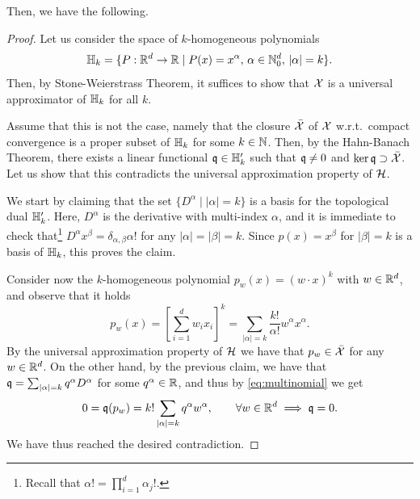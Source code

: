 Then, we have the following.

\begin{proof}
    Let us consider the space of $k$-homogeneous polynomials 
    \begin{equation}
    \mathbb{H}_k = \{ P:\mathbb{R}^d\to \mathbb{R}\mid P(x) = x^\alpha,\, \alpha\in \mathbb{N}^d_0,\, |\alpha|=k\}.
    \end{equation}
    Then, by Stone-Weierstrass Theorem, it suffices to show that $\mathcal{X}$ is a universal approximator of $\mathbb{H}_k$ for all $k$.

    Assume that this is not the case, namely that the closure $\bar{\mathcal{X}}$ of $\mathcal{X}$ w.r.t.~compact convergence is a proper subset of $\mathbb{H}_k$ for some $k\in \mathbb{N}$. 
    Then, by the Hahn-Banach Theorem, there exists a linear functional $\mathfrak{q}\in \mathbb{H}_k'$ such that $\mathfrak{q}\neq 0$ and $\ker\mathfrak{q}\supset\bar{\mathcal{X}}$.
    Let us show that this contradicts the universal approximation property of $\mathcal{H}$.

    We start by claiming that the set $\{D^\alpha \mid |\alpha|=k\}$ is a basis for the topological dual $\mathbb{H}_k'$. Here, $D^\alpha$ is the derivative with multi-index $\alpha$, and it is immediate to check that\footnote{Recall that $\alpha!=\prod_{i=1}^d \alpha_j!$.} $D^\alpha x^\beta = \delta_{\alpha,\beta}\alpha!$ for any $|\alpha|=|\beta|=k$. Since $p(x)=x^\beta$ for $|\beta|=k$ is a basis of $\mathbb{H}_k$, this proves the claim.

    Consider now the $k$-homogeneous polynomial $p_w(x)=(w\cdot x)^k$ with $w\in \mathbb{R}^d$, and observe that it holds
    \begin{equation}
        \label{eq:multinomial}
        p_w(x) = \left[ \sum_{i=1}^d w_ix_i \right]^k = \sum_{|\alpha|=k}\frac{k!}{\alpha!}w^\alpha x^\alpha.
    \end{equation}
    By the universal approximation property of $\mathcal{H}$ we have that $p_w\in \bar{\mathcal{X}}$ for any $w\in \mathbb{R}^d$.
    On the other hand, by the previous claim, we have that $\mathfrak{q} = \sum_{|\alpha|=k} q^\alpha D^\alpha$ for some $q^\alpha\in \mathbb{R}$, and thus by \eqref{eq:multinomial} we get
    \begin{equation}
        0=\mathfrak{q}(p_w) = k! \sum_{|\alpha|=k}q^\alpha w^\alpha, \qquad \forall w\in \mathbb{R}^d \implies \mathfrak{q} =0.
    \end{equation}
    We have thus reached the desired contradiction.
\end{proof}

